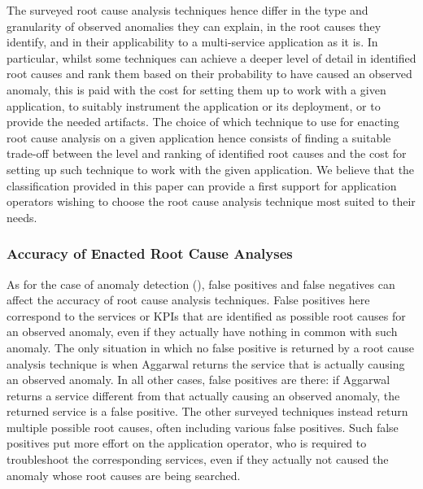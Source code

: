 The surveyed root cause analysis techniques hence differ in the type and granularity of observed anomalies they can explain, in the root causes they identify, and in their applicability to a multi-service application as it is.
In particular, whilst some techniques can achieve a deeper level of detail in identified root causes and rank them based on their probability to have caused an observed anomaly, this is paid with the cost for setting them up to work with a given application, \viz to suitably instrument the application or its deployment, or to provide the needed artifacts.
The choice of which technique to use for enacting root cause analysis on a given application hence consists of finding a suitable trade-off between the level and ranking of identified root causes and the cost for setting up such technique to work with the given application. 
We believe that the classification provided in this paper can provide a first support for application operators wishing to choose the root cause analysis technique most suited to their needs.

\subsubsection{Accuracy of Enacted Root Cause Analyses}
\label{sec:rca:discussion:accuracy}
\label{sec:rca:discussion:false-positives-negatives}
As for the case of anomaly detection (), false positives and false negatives can affect the accuracy of root cause analysis techniques.
False positives here correspond to the services or KPIs that are identified as possible root causes for an observed anomaly, even if they actually have nothing in common with such anomaly.
The only situation in which no false positive is returned by a root cause analysis technique is when Aggarwal \etal \cite{10_Aggarwal2020_FaultsGoldenSignals} returns the service that is actually causing an observed anomaly.
In all other cases, false positives are there: if Aggarwal \etal \cite{10_Aggarwal2020_FaultsGoldenSignals} returns a service different from that actually causing an observed anomaly, the returned service is a false positive.
The other surveyed techniques instead return multiple possible root causes, often including various false positives.
Such false positives put more effort on the application operator, who is required to troubleshoot the corresponding services, even if they actually not caused the anomaly whose root causes are being searched.

